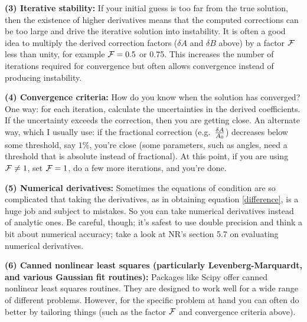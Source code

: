 \documentclass[psfig,preprint]{aastex}
\begin{document}
	{\bf (3) Iterative stability:} If your initial guess is too far
from the true solution, then the existence of higher derivatives means
that the computed corrections can be too large and drive the iterative
solution into instability. It is often a good idea to multiply the
derived correction factors ($\delta A$ and $\delta B$ above) by a factor
${\cal F}$ less than unity, for example ${\cal F} = 0.5$ or 0.75. This
increases the number of iterations required for convergence but often
allows convergence instead of producing instability.

	{\bf (4) Convergence criteria:} How do you know when the
solution has converged? One way: for each iteration, calculate the
uncertainties in the derived coefficients. If the uncertainty exceeds
the correction, then you are getting close. An alternate way, which I
usually use: if the fractional correction (e.g.~$\delta A \over A_0$)
decreases below some threshold, say $1\%$, you're close (some
parameters, such as angles, need a threshold that is absolute instead of
fractional).  At this point, if you are using ${\cal F} \neq 1$, set
${\cal F} = 1$, do a few more iterations, and you're done. 

	{\bf (5) Numerical derivatives:} Sometimes the equations of
condition are so complicated that taking the derivatives, as in
obtaining equation \ref{difference}, is a huge job and subject to
mistakes. So you can take numerical derivatives instead of analytic
ones. Be careful, though; it's safest to use double precision and think
a bit about numerical accuracy; take a look at NR's section 5.7 on
evaluating numerical derivatives.

	{\bf (6) Canned nonlinear least squares (particularly
Levenberg-Marquardt, and various Gaussian fit routines):} Packages like
Scipy offer canned nonlinear least squares routines.  They are designed to
work well for a wide range of different problems.  However, for the
specific problem at hand you can often do better by tailoring things
(such as the factor ${\cal F}$ and convergence criteria above).  

\end{document}

